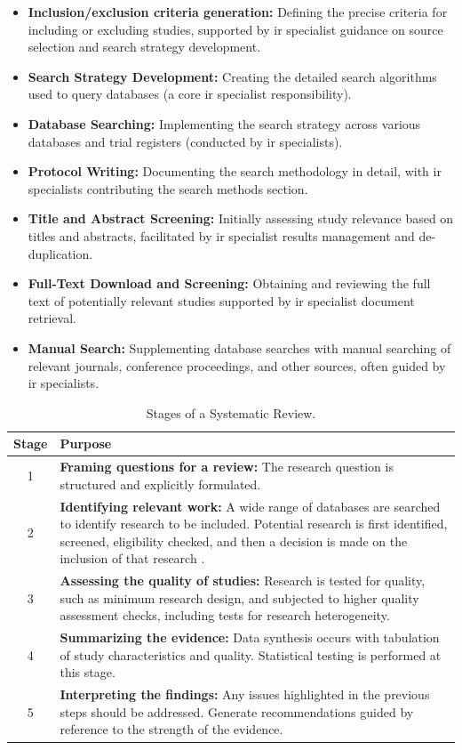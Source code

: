 \documentclass[10pt,oneside]{book}
\begin{document}
\begin{itemize}
\item {\bf{Inclusion/exclusion criteria generation:}} Defining the precise criteria for including or excluding studies, supported by \gls*{ir} specialist guidance on source selection and search strategy development.
\item {\bf{Search Strategy Development:}} Creating the detailed search algorithms used to query databases (a core \gls*{ir} specialist responsibility).
\item {\bf{Database Searching:}} Implementing the search strategy across various databases and trial registers (conducted by \gls*{ir} specialists).
\item {\bf{Protocol Writing:}} Documenting the search methodology in detail, with \gls*{ir} specialists contributing the search methods section.
\item {\bf{Title and Abstract Screening:}} Initially assessing study relevance based on titles and abstracts, facilitated by \gls*{ir} specialist results management and de-duplication.
\item {\bf{Full-Text Download and Screening:}} Obtaining and reviewing the full text of potentially relevant studies supported by \gls*{ir} specialist document retrieval.
\item {\bf{Manual Search:}} Supplementing database searches with manual searching of relevant journals, conference proceedings, and other sources, often guided by \gls*{ir} specialists.
\end{itemize}



\begin{table}[t]
\centering
\small
\begin{tabular}{|c|p{}|}
\hline
\textbf{Stage} & \textbf{Purpose} \\
\hline
1 & \textbf{Framing questions for a review:} The research question is structured and explicitly formulated. \\\hline
2 & \textbf{Identifying relevant work:} A wide range of databases are searched to identify research to be included. Potential research is first identified, screened, eligibility checked, and then a decision is made on the inclusion of that research \cite{tawfik_step_2019}. \\\hline
3 & \textbf{Assessing the quality of studies:} Research is tested for quality, such as minimum research design, and subjected to higher quality assessment checks, including tests for research heterogeneity. \\\hline
4 & \textbf{Summarizing the evidence:} Data synthesis occurs with tabulation of study characteristics and quality. Statistical testing is performed at this stage. \\\hline
5 & \textbf{Interpreting the findings:} Any issues highlighted in the previous steps should be addressed. Generate recommendations guided by reference to the strength of the evidence. \\
\hline
\end{tabular}
\caption{Stages of a Systematic Review.}
\label{tab:stages_of_systematic review}
\end{table}
\end{document}
